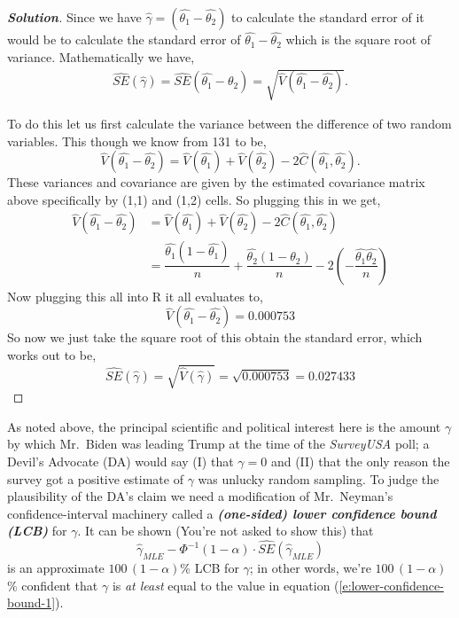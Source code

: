 \documentclass[12pt]{article}
\newcommand{\lrp}[1]{\left(#1\right)}
\newenvironment{solution}{\begin{tcolorbox}[breakable]\begin{proof}[\textbf{\textit{Solution}}] }{\end{proof}\end{tcolorbox}}
\newcommand{\bi}[1]{\textbf{\textit{#1}}}
\begin{document}
\begin{itemize}
\begin{itemize}
\begin{itemize}
\begin{solution}
    Since we have $\hat{\gamma} = (\hat{\theta_1} - \hat{\theta_2})$ to calculate the standard error of it would be to calculate the standard error of $\hat{\theta_1} - \hat{\theta_2}$ which is the square root of variance. Mathematically we have,
    \begin{align*}
        \widehat{SE}(\hat{\gamma}) = \widehat{SE}(\hat{\theta_1} - \hat{\theta_2}) = \sqrt{\hat{V}(\hat{\theta_1} - \hat{\theta_2})}.
    \end{align*}

    To do this let us first calculate the variance between the difference of two random variables. This though we know from 131 to be,
    \[\hat{V}(\hat{\theta_1}-\hat{\theta_2}) = \hat{V}(\hat{\theta_1})+\hat{V}(\hat{\theta_2}) - 2\hat{C}(\hat{\theta_1},\hat{\theta_2}).\]
    These variances and covariance are given by the estimated covariance matrix above specifically by (1,1) and (1,2) cells. So plugging this in we get,
    \begin{align*}
        \hat{V}(\hat{\theta_1}-\hat{\theta_2}) &= \hat{V}(\hat{\theta_1})+\hat{V}(\hat{\theta_2}) - 2\hat{C}(\hat{\theta_1},\hat{\theta_2}) \\ 
        &=\dfrac{\hat{\theta_1}(1-\hat{\theta_1})}{n} + \dfrac{\hat{\theta_2}(1-\theta_2)}{n} - 2\lrp{-\dfrac{\hat{\theta_1}\hat{\theta_2}}{n}} 
    \end{align*}
    Now plugging this all into R it all evaluates to,
    \[\hat{V}(\hat{\theta_1}-\hat{\theta_2}) = 0.000753\]
    So now we just take the square root of this obtain the standard error, which works out to be,
    \[\widehat{SE}(\hat{\gamma}) = \sqrt{\hat{V}(\hat{\gamma})} = \sqrt{0.000753} = 0.027433\]

\end{solution}
\vspace*{0.1in}

\end{itemize}

As noted above, the principal scientific and political interest here is the amount $\gamma$ by which Mr.~Biden was leading Trump at the time of the \textit{SurveyUSA} poll; a Devil's Advocate (DA) would say (I) that $\gamma = 0$ and (II) that the only reason the survey got a positive estimate of $\gamma$ was unlucky random sampling. To judge the plausibility of the DA's claim we need a modification of Mr.~Neyman's confidence-interval machinery called a \bi{(one-sided) lower confidence bound (LCB)} for $\gamma$. It can be shown (You're not asked to show this) that
\begin{equation} \label{e:lower-confidence-bound-1}
\hat{ \gamma }_{ MLE } - \Phi^{ -1 } ( 1 - \alpha ) \cdot \widehat{ SE } \left( \hat{ \gamma }_{ MLE } \right)
\end{equation}
is an approximate $100 \, ( 1 - \alpha )$\% LCB for $\gamma$; in other words, we're $100 \, ( 1 - \alpha )$\% confident that $\gamma$ is \textit{at least} equal to the value in equation (\ref{e:lower-confidence-bound-1}).


\end{itemize}
\end{itemize}
\end{document}
